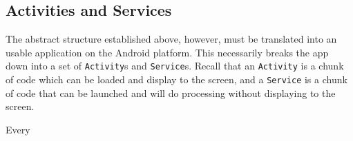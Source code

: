 \subsection{Activities and Services}

The abstract structure established above, however, must be translated into an usable application on the Android platform. This necessarily 
breaks the app down into a set of \verb|Activity|s and \verb|Service|s. Recall that an \verb|Activity| is a chunk of code which can be loaded
and display to the screen, and a \verb|Service| is a chunk of code that can be launched and will do processing without displaying to the 
screen.

Every
